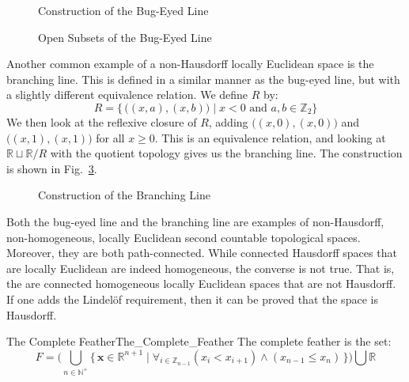 \documentclass{article}                                                        %
\begin{document}
        \begin{figure}[H]
                \centering
                \captionsetup{type=figure}
                
                \caption{Construction of the Bug-Eyed Line}
                \label{fig:Bug_Eyed_Line}
        \end{figure}
        \begin{figure}[H]
                \centering
                \captionsetup{type=figure}
                
                \caption{Open Subsets of the Bug-Eyed Line}
                \label{fig:Open_Neighborhoods_of_Origins_in_Bug_Eyed_Line}
        \end{figure}
        Another common example of a non-Hausdorff locally Euclidean space is
        the branching line. This is defined in a similar manner as the
        bug-eyed line, but with a slightly different equivalence relation.
        We define $R$ by:
        \begin{equation}
                R=\big\{\,\big((x,a),(x,b)\big)\;|\;
                    x<0\textrm{ and }a,b\in\mathbb{Z}_{2}\big\}
        \end{equation}
        We then look at the reflexive closure of $R$, adding
        $\big((x,0),(x,0)\big)$ and $\big((x,1),(x,1)\big)$ for all
        $x\geq{0}$. This is an equivalence relation, and looking at
        $\mathbb{R}\sqcup\mathbb{R}/R$ with the quotient topology gives us
        the branching line. The construction is shown in
        Fig.~\ref{fig:Construction_of_Branching_Line}.
        \begin{figure}[H]
                \centering
                \captionsetup{type=figure}
                
                \caption{Construction of the Branching Line}
                \label{fig:Construction_of_Branching_Line}
        \end{figure}
        Both the bug-eyed line and the branching line are examples of
        non-Hausdorff, non-homogeneous, locally Euclidean second countable
        topological spaces. Moreover, they are both path-connected. While
        connected Hausdorff spaces that are locally Euclidean are indeed
        homogeneous, the converse is not true. That is, the are connected
        homogeneous locally Euclidean spaces that are not Hausdorff. If one
        adds the Lindel\"{o}f requirement, then it can be proved that the
        space is Hausdorff.
        \begin{fdefinition}{The Complete Feather}{The_Complete_Feather}
                The complete feather is the set:
                \begin{equation*}
                    F=\Big(\bigcup_{n\in\mathbb{N}^{+}}
                        \big\{\,\mathbf{x}\in\mathbb{R}^{n+1}\;|\;
                            \forall_{i\in\mathbb{Z}_{n-1}}(x_{i}<x_{i+1})
                            \land(x_{n-1}\leq{x}_{n})\,\big\}\Big)
                        \bigcup\mathbb{R}
                \end{equation*}
        \end{fdefinition}
\end{document}
